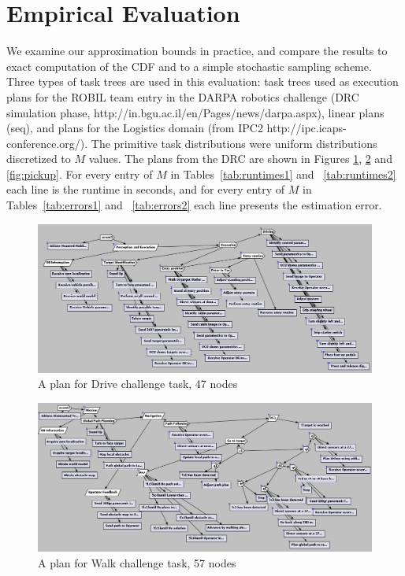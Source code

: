 \documentclass[review]{elsarticle}
\begin{document}
\section{Empirical Evaluation}\label{sec:exp}


We examine our approximation bounds in practice, and compare the results to
exact computation of the CDF and to a simple stochastic sampling scheme. Three types of task trees
are used in this evaluation:
task trees used as execution plans for the ROBIL team entry in the DARPA
robotics challenge (DRC simulation phase, http://in.bgu.ac.il/en/Pages/news/dar\textunderscore pa.aspx), linear plans (seq), and plans for
the Logistics domain (from IPC2 http://ipc.icaps-conference.org/).
The primitive task distributions were uniform
distributions discretized to $M$ values.  
The plans from the DRC are shown in Figures {\ref{fig:drive}}, {\ref{fig:walk}} and {\ref{fig:pickup}}. For every entry of $M$ in Tables~\ref{tab:runtimes1} and ~\ref{tab:runtimes2} each line is the runtime in seconds, and for every entry of $M$ in Tables~\ref{tab:errors1} and ~\ref{tab:errors2} each line presents the estimation error.


\begin{figure}
	\begin{center}
	\includegraphics[width=\textwidth]{plan1}
	\caption{A plan for Drive challenge task, 47 nodes}
	\label{fig:drive}
	\end{center}
\end{figure}

\begin{figure}
	\begin{center}
	\includegraphics[width=\textwidth]{plan2}
	\caption{A plan for Walk challenge task, 57 nodes}
	\label{fig:walk}
	\end{center}
\end{figure}
\end{document}
